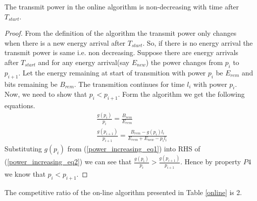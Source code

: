 \begin{lemma}
The transmit power in the online algorithm is non-decreasing with time after $T_{start}$.
\label{online_power}
\end{lemma}
\begin{proof}
From the definition of the algorithm the transmit power only changes when there is a new energy arrival after $T_{start}$. So, if there is no energy arrival the transmit power is same i.e. non decreasing. Suppose there are energy arrivals after $T_{start}$ and for any energy arrival(say $E_{new}$) the power changes from $p_i$ to $p_{i+1}$. Let the energy remaining at start of transmition with power $p_i$ be $E_{rem}$ and bits remaining be $B_{rem}$. The transmition continues for time $l_i$ with power $p_i$. Now, we need to show that $p_i<p_{i+1}$. Form the algorithm we get the following equations. 
\begin{align}
&\frac{g(p_i)}{p_i}=\frac{B_{rem}}{E_{rem}} \label{power_increasing_eq1}
\\
&\frac{g(p_{i+1})}{p_{i+1}}=\frac{B_{rem}-g(p_i) l_i}{E_{rem}+E_{new}-p_i l_i}\label{power_increasing_eq2}
\end{align}
Substituting $g(p_i)$ from (\ref{power_increasing_eq1}) into RHS of (\ref{power_increasing_eq2}) we can see that $\frac{g(p_i)}{p_i}>\frac{g(p_{i+1})}{p_{i+1}}$. Hence by property $P4$ we know that $p_i<p_{i+1}$.
\end{proof}
\begin{theorem}
The competitive ratio of the on-line algorithm presented in Table \ref{online} is 2.
\end{theorem}
